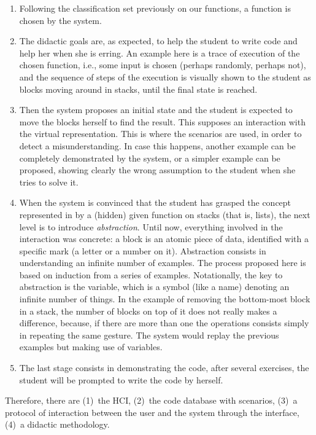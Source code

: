 \begin{enumerate}

  \item Following the classification set previously on our \Erlang
    functions, a function is chosen by the system.

  \item The didactic goals are, as expected, to help the student to
    write \Erlang code and help her when she is erring. An example
    here is a trace of execution of the chosen function, i.e., some
    input is chosen (perhaps randomly, perhaps not), and the sequence
    of steps of the execution is visually shown to the student as
    blocks moving around in stacks, until the final state is reached.

  \item Then the system proposes an initial state and the student is
    expected to move the blocks herself to find the result. This
    supposes an interaction with the virtual representation. This is
    where the scenarios are used, in order to detect a
    misunderstanding. In case this happens, another example can be
    completely demonstrated by the system, or a simpler example can be
    proposed, showing clearly the wrong assumption to the student when
    she tries to solve it.

  \item When the system is convinced that the student has grasped the
    concept represented in \Erlang by a (hidden) given function on
    stacks (that is, lists), the next level is to introduce
    \emph{abstraction}. Until now, everything involved in the
    interaction was concrete: a block is an atomic piece of data,
    identified with a specific mark (a letter or a number on
    it). Abstraction consists in understanding an infinite number of
    examples. The process proposed here is based on induction from a
    series of examples. Notationally, the key to abstraction is the
    variable, which is a symbol (like a name) denoting an infinite
    number of things. In the example of removing the bottom-most block
    in a stack, the number of blocks on top of it does not really
    makes a difference, because, if there are more than one the
    operations consists simply in repeating the same gesture. The
    system would replay the previous examples but making use of
    variables.

  \item The last stage consists in demonstrating the \Erlang code,
    after several exercises, the student will be prompted to write the
    \Erlang code by herself.

\end{enumerate}
Therefore, there are (1)~the HCI, (2)~the code database with
scenarios, (3)~a protocol of interaction between the user and the
system through the interface, (4)~a didactic methodology.
